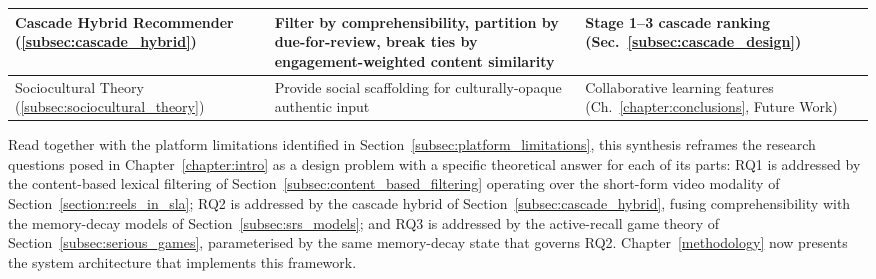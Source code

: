 \begin{table}[htbp]
\begin{tabular}{p{3.6cm}p{4.6cm}p{4.6cm}}
            \hline
            Cascade Hybrid Recommender (\ref{subsec:cascade_hybrid}) &
            Filter by comprehensibility, partition by due-for-review, break ties by engagement-weighted content similarity &
            Stage 1--3 cascade ranking (Sec.~\ref{subsec:cascade_design}) \\
            \hline
            Sociocultural Theory (\ref{subsec:sociocultural_theory}) &
            Provide social scaffolding for culturally-opaque authentic input &
            Collaborative learning features (Ch.~\ref{chapter:conclusions}, Future Work) \\
            \hline
        \end{tabular}
    \end{table}

    Read together with the platform limitations identified in Section~\ref{subsec:platform_limitations}, this synthesis reframes the research questions posed in Chapter~\ref{chapter:intro} as a design problem with a specific theoretical answer for each of its parts: RQ1 is addressed by the content-based lexical filtering of Section~\ref{subsec:content_based_filtering} operating over the short-form video modality of Section~\ref{section:reels_in_sla}; RQ2 is addressed by the cascade hybrid of Section~\ref{subsec:cascade_hybrid}, fusing comprehensibility with the memory-decay models of Section~\ref{subsec:srs_models}; and RQ3 is addressed by the active-recall game theory of Section~\ref{subsec:serious_games}, parameterised by the same memory-decay state that governs RQ2. Chapter~\ref{methodology} now presents the system architecture that implements this framework.

\newpage
